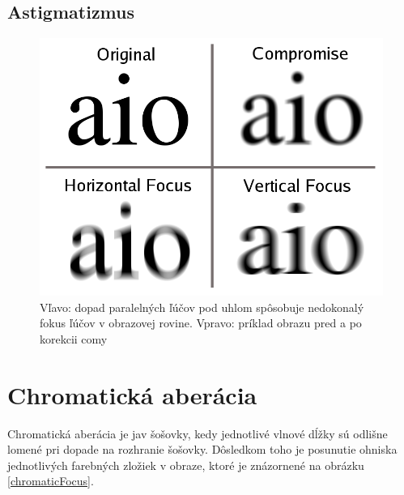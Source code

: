 \subsection{Astigmatizmus}

\begin{figure}[h]
    \label{comaDescribe}
\includegraphics[scale=0.30]{obrazky-figures/astigmatism.png}
    \centering \caption{Vľavo: dopad paralelných ľúčov pod uhlom spôsobuje nedokonalý fokus ľúčov v
    obrazovej rovine. Vpravo: príklad obrazu pred a po korekcii comy}
\end{figure}



\section{Chromatická aberácia}
Chromatická aberácia je jav šošovky, kedy jednotlivé vlnové dĺžky sú odlišne lomené pri dopade na
rozhranie šošovky. Dôsledkom toho je posunutie ohniska jednotlivých farebných zložiek v obraze, ktoré je
znázornené na obrázku \ref{chromaticFocus}. 

